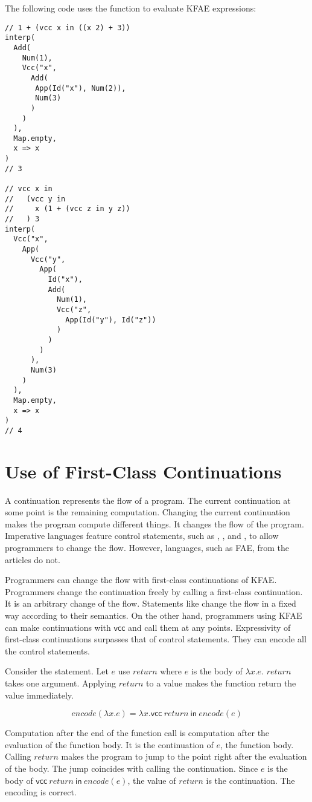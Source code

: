 The following code uses the function to evaluate KFAE expressions:

\begin{verbatim}
// 1 + (vcc x in ((x 2) + 3))
interp(
  Add(
    Num(1),
    Vcc("x",
      Add(
       App(Id("x"), Num(2)),
       Num(3)
      )
    )
  ),
  Map.empty,
  x => x
)
// 3

// vcc x in
//   (vcc y in
//     x (1 + (vcc z in y z))
//   ) 3
interp(
  Vcc("x",
    App(
      Vcc("y",
        App(
          Id("x"),
          Add(
            Num(1),
            Vcc("z",
              App(Id("y"), Id("z"))
            )
          )
        )
      ),
      Num(3)
    )
  ),
  Map.empty,
  x => x
)
// 4
\end{verbatim}

\section{Use of First-Class Continuations}

A continuation represents the flow of a program. The current continuation at some
point is the remaining computation. Changing the current continuation makes the
program compute different things. It changes the flow of the program. Imperative
languages feature control statements, such as , , and
, to allow programmers to change the flow. However, languages,
such as FAE, from the articles do not.

Programmers can change the flow with first-class continuations of KFAE.
Programmers change the continuation freely by calling a first-class continuation.
It is an arbitrary change of the flow. Statements like  change the
flow in a fixed way according to their semantics. On the other hand, programmers
using KFAE can make continuations with $\textsf{vcc}$ and call them at any
points. Expressivity of first-class continuations surpasses that of control
statements. They can encode all the control statements.

Consider the  statement. Let $e$ use $return$ where $e$ is the body
of $\lambda x.e$. $return$ takes one argument. Applying $return$ to a value makes
the function return the value immediately.

\[
\textit{encode}(\lambda x.e)=
\lambda x.\textsf{vcc}\ return\ \textsf{in}\ \textit{encode}(e)
\]

Computation after the end of the function call is computation after the
evaluation of the function body. It is the continuation of $e$, the function
body. Calling $return$ makes the program to jump to the point right after the
evaluation of the body. The jump coincides with calling the continuation. Since
$e$ is the body of $\textsf{vcc}\ return\ \textsf{in}\ \textit{encode}(e)$, the
value of $return$ is the continuation. The encoding is correct.

